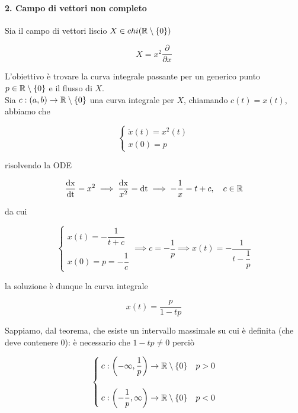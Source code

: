 \paragraph{2. Campo di vettori non completo}

Sia il campo di vettori liscio $ X \in chi(\mathbb{R} \setminus \{0\}) $

\begin{equation}
	X = x^{2} \dfrac{\partial}{\partial x}
\end{equation}

L'obiettivo è trovare la curva integrale passante per un generico punto $ p \in \mathbb{R} \setminus \{0\} $ e il flusso di $ X $.\\
Sia $ c : (a,b) \to \mathbb{R} \setminus \{0\} $ una curva integrale per $ X $, chiamando $ c(t) = x(t) $, abbiamo che

\begin{equation}
	\begin{cases}
		\dot{x}(t) = x^{2}(t)\\
		x(0) = p
	\end{cases}
\end{equation}

risolvendo la ODE

\begin{equation}
	\dfrac{\operatorname{dx}}{\operatorname{dt}} = x^{2} %
	\implies %
	\dfrac{\operatorname{dx}}{x^{2}} = \operatorname{dt} %
	\implies %
	- \dfrac{1}{x} = t + c, \quad c \in \R
\end{equation}

da cui

\begin{equation}
	\begin{cases}
		x(t) = - \dfrac{1}{t + c}\\\\
		x(0) = p = - \dfrac{1}{c}
	\end{cases}%
	\implies %
	c = - \dfrac{1}{p} %
	\implies %
	x(t) = - \dfrac{1}{t - \dfrac{1}{p}}
\end{equation}

la soluzione è dunque la curva integrale

\begin{equation}
	x(t) = \dfrac{p}{1 - t p}
\end{equation}

Sappiamo, dal teorema, che esiste un intervallo massimale su cui è definita (che deve contenere 0): è necessario che $ 1-tp \neq 0 $ perciò

\begin{equation}
	\begin{cases}
		c : \left( -\infty, \dfrac{1}{p} \right) \to \mathbb{R} \setminus \{0\} & p > 0\\\\
		c : \left( -\dfrac{1}{p}, \infty \right) \to \mathbb{R} \setminus \{0\} & p < 0
	\end{cases}
\end{equation}

